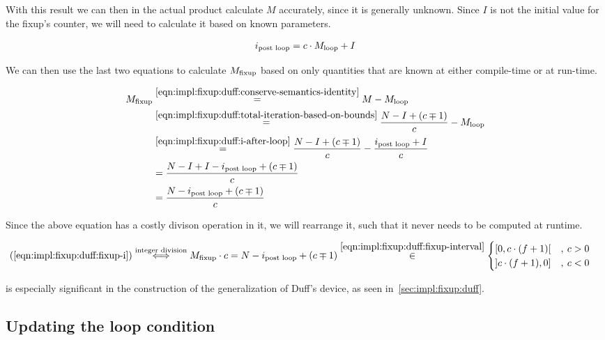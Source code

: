 With this result we can then in the actual product calculate $M$ accurately, since it is generally unknown.
Since $I$ is not the initial value for the fixup's counter, we will need to calculate it based on known parameters.

\begin{equation}\label{eqn:impl:fixup:duff:i-after-loop}
\begin{aligned}
    i_\text{post loop} = c \cdot M_{\text{loop}} + I
\end{aligned}
\end{equation}

We can then use the last two equations to calculate $M_{\text{fixup}}$ based on only quantities that are known at either compile-time or at run-time.

\begin{equation}\label{eqn:impl:fixup:duff:fixup-i}
\begin{aligned}
    M_{\text{fixup}} & \overset{\ref{eqn:impl:fixup:duff:conserve-semantics-identity}}{=} M - M_{\text{loop}} \\
    & \overset{\ref{eqn:impl:fixup:duff:total-iteration-based-on-bounds}}{=}
    \frac{N - I + (c \mp 1)}{c} - M_{\text{loop}} \\
    & \overset{\ref{eqn:impl:fixup:duff:i-after-loop}}{=}
    \frac{N - I + (c \mp 1)}{c} - \frac{i_\text{post loop} + I}{c} \\
    &= \frac{N - I + I - i_\text{post loop} + (c \mp 1)}{c}\\
    &= \frac{N - i_\text{post loop} + (c \mp 1)}{c}
\end{aligned}
\end{equation}

Since the above equation has a costly divison operation in it, we will rearrange it, such that it never needs to be computed at runtime.

\begin{equation}\label{eqn:impl:fixup:duff:fixup-i-mult}
\begin{aligned}
    (\ref{eqn:impl:fixup:duff:fixup-i}) &\overset{\text{integer division}}{\Longleftrightarrow} M_{\text{fixup}} \cdot c = N - i_\text{post loop} + (c \mp 1) \overset{\ref{eqn:impl:fixup:duff:fixup-interval}}{\in}  \begin{cases} \lbrack 0, c \cdot (f + 1) \lbrack &, \medspace c > 0\\ \rbrack c \cdot (f + 1), 0 \rbrack &, \medspace c < 0 \end{cases} 
\end{aligned}
\end{equation}

 is especially significant in the construction of the generalization of Duff's device, as seen in~\cref{sec:impl:fixup:duff}.

\subsection{Updating the loop condition}\label{sec:impl:fixup:header-cond}

